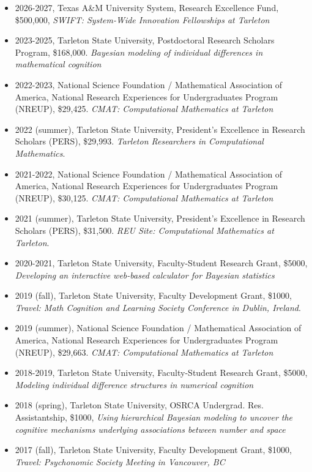 \documentclass[article,10pt]{article}
\begin{document}
\begin{itemize}
\item 2026-2027, Texas A\&M University System, Research Excellence Fund, \$500,000, \emph{SWIFT: System-Wide Innovation Fellowships at Tarleton}
\item 2023-2025, Tarleton State University, Postdoctoral Research Scholars Program, \$168,000. \emph{Bayesian modeling of individual differences in mathematical cognition}
\item 2022-2023, National Science Foundation / Mathematical Association of America, National Research Experiences for Undergraduates Program (NREUP), \$29,425. \emph{CMAT: Computational Mathematics at Tarleton}
\item 2022 (summer), Tarleton State University, President's Excellence in Research Scholars (PERS), \$29,993. \emph{Tarleton Researchers in Computational Mathematics}.
\item 2021-2022, National Science Foundation / Mathematical Association of America, National Research Experiences for Undergraduates Program (NREUP), \$30,125. \emph{CMAT: Computational Mathematics at Tarleton}
\item 2021 (summer), Tarleton State University, President's Excellence in Research Scholars (PERS), \$31,500. \emph{REU Site: Computational Mathematics at Tarleton}.
\item 2020-2021, Tarleton State University, Faculty-Student Research Grant, \$5000, \emph{Developing an interactive web-based calculator for Bayesian statistics}
\item 2019 (fall), Tarleton State University, Faculty Development Grant, \$1000, \emph{Travel: Math Cognition and Learning Society Conference in Dublin, Ireland}.
\item 2019 (summer), National Science Foundation / Mathematical Association of America, National Research Experiences for Undergraduates Program (NREUP), \$29,663. \emph{CMAT: Computational Mathematics at Tarleton}
\item 2018-2019, Tarleton State University, Faculty-Student Research Grant, \$5000, \emph{Modeling individual difference structures in numerical cognition}
\item 2018 (spring), Tarleton State University, OSRCA Undergrad. Res. Assistantship, \$1000, \emph{Using hierarchical Bayesian modeling to uncover the cognitive mechanisms underlying associations between number and space}
\item 2017 (fall), Tarleton State University, Faculty Development Grant, \$1000, \emph{Travel: Psychonomic Society Meeting in Vancouver, BC}

\end{itemize}
\end{document}
